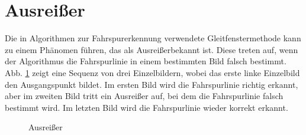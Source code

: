 \documentclass[arbeit=studie,oneside,BCOR=12mm]{ArbeitRST}
\begin{document}
\section{Ausrei{\ss}er}

Die in Algorithmen zur Fahrspurerkennung verwendete Gleitfenstermethode kann zu
einem Phänomen führen, das als \glqq Ausreißer\grqq bekannt ist. Diese treten auf, wenn
der Algorithmus die Fahrspurlinie in einem bestimmten Bild falsch bestimmt.
Abb. \ref{ausrei} zeigt eine Sequenz von drei Einzelbildern, wobei das erste linke
Einzelbild den Ausgangspunkt bildet. Im ersten Bild wird die Fahrspurlinie
richtig erkannt, aber im zweiten Bild tritt ein Ausreißer auf, bei dem die
Fahrspurlinie falsch bestimmt wird. Im letzten Bild wird die Fahrspurlinie
wieder korrekt erkannt.

\begin{figure}[h]
    \centering
    \caption{Ausrei{\ss}er}
    \label{ausrei}
\end{figure}
\end{document}
